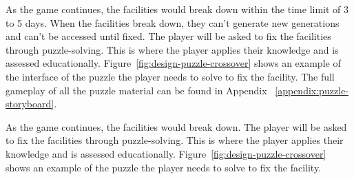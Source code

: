 \documentclass[12pt,oneside,openright,a4paper]{cpe-english-project}
\begin{document}
\begin{itemize}
\begin{minipage}[c]{\textwidth}\centering
{}
\label{fig:design-main-game-page}
\end{minipage}


As the game continues, the facilities would break down within the time limit of 3 to 5 days. When the facilities break down, they can’t generate new generations and can’t be accessed until fixed. The player will be asked to fix the facilities through puzzle-solving. This is where the player applies their knowledge and is assessed educationally. Figure~\ref{fig:design-puzzle-crossover} shows an example of the interface of the puzzle the player needs to solve to fix the facility. The full gameplay of all the puzzle material can be found in Appendix ~\ref{appendix:puzzle-storyboard}.


As the game continues, the facilities would break down. The player will be asked to fix the facilities through puzzle-solving. This is where the player applies their knowledge and is assessed educationally. Figure~\ref{fig:design-puzzle-crossover} shows an example of the puzzle the player needs to solve to fix the facility.

\begin{minipage}[c]{\textwidth}\centering
{}
\label{fig:design-puzzle-crossover}
\end{minipage}


\end{itemize}
\end{document}
